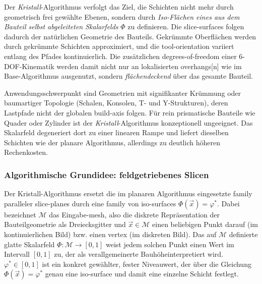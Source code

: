                 Der \emph{Kristall}-Algorithmus verfolgt das Ziel, die Schichten nicht mehr durch geometrisch frei gewählte Ebenen, sondern durch \emph{Iso-Flächen eines aus dem Bauteil selbst abgeleiteten Skalarfelds} $\Phi$ zu definieren.
                Die \glspl{slice-surface} folgen dadurch der natürlichen Geometrie des Bauteils.
                Gekrümmte Oberflächen werden durch gekrümmte Schichten approximiert, und die \gls{tool-orientation} variiert entlang des Pfades kontinuierlich.
                Die zusätzlichen \gls{degrees-of-freedom} einer 6-\ac{DOF}-Kinematik werden damit nicht nur an lokalisierten \glspl{overhang}[n] wie im Base-Algorithmus ausgenutzt, sondern \emph{flächendeckend} über das gesamte Bauteil.

                Anwendungsschwerpunkt sind Geometrien mit signifikanter Krümmung oder baumartiger Topologie (Schalen, Konsolen, T- und Y-Strukturen), deren Lastpfade nicht der globalen \gls{build-axis} folgen.
                Für rein prismatische Bauteile wie Quader oder Zylinder ist der \emph{Kristall}-Algorithmus konzeptionell ungeeignet.
                Das Skalarfeld degeneriert dort zu einer linearen Rampe und liefert dieselben Schichten wie der planare Algorithmus, allerdings zu deutlich höheren Rechenkosten.

            \subsubsection{Algorithmische Grundidee: feldgetriebenes Slicen}\label{subsubsec:concept-crystal-core-idea}
                Der Kristall-Algorithmus ersetzt die im planaren Algorithmus eingesetzte \gls{family} pa\-ralleler \glspl{slice-plane} durch eine \gls{family} von \glspl{iso-surface} $\Phi(\vec{x}) = \varphi^*$.
                Dabei bezeichnet $\mathcal{M}$ das Eingabe-\gls{mesh}, also die diskrete Repräsentation der Bauteilgeometrie als Dreiecksgitter und $\vec{x} \in \mathcal{M}$ einen beliebigen Punkt darauf (im kontinuierlichen Bild) bzw. einen \gls{vertex} (im diskreten Bild).
                Das auf $\mathcal{M}$ definierte glatte Skalarfeld $\Phi : \mathcal{M} \to [0, 1]$ weist jedem solchen Punkt einen Wert im Intervall $[0, 1]$ zu, der als verallgemeinerte \glqq Bauhöhe\grqq interpretiert wird.
                $\varphi^* \in [0, 1]$ ist ein konkret gewählter, fester Niveauwert, der über die Gleichung $\Phi(\vec{x}) = \varphi^*$ genau eine \gls{iso-surface} und damit eine einzelne Schicht festlegt.

